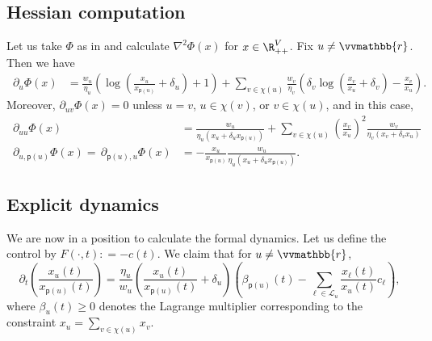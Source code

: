 \documentclass{toc}
\newcommand{\calL}{\mathcal L}
\newcommand{\vvr}{\vvmathbb{r}}
\newcommand{\seteq}{\mathrel{\mathop:}=}
\newcommand{\sfp}{\mathsf{p}}
\begin{document}
\subsection{Hessian computation}

Let us take $\Phi$ as in 
and calculate $\nabla^2 \Phi(x)$ for $x \in \R_{++}^{V}$.
Fix $u \neq \vvr$. 
Then we have
\begin{align}
\, \partial_u\Phi(x) &= 
\frac{w_u}{\eta_u}
\left(\log\left(\frac{x_u}{x_{\sfp(u)}}+\delta_u\right) +1\right)
+ \sum_{v \in \chi(u)}\frac{w_v}{\eta_v}\left(\delta_v\log\left(\frac{x_v}{x_u}+\delta_v\right) - \frac{x_v}{x_u}\right). \label{eq:grad-phi}
\end{align}
Moreover, $\partial_{uv} \Phi(x) = 0$ unless $u=v$, $u \in \chi(v)$, or $v \in \chi(u)$, and in this case,
\begin{align*}
\, \partial_{uu}\Phi(x) &= \frac{w_u}{\eta_u(x_u+\delta_u x_{\sfp(u)})} + \sum_{v\in \chi(u)} \left(\frac{x_v}{x_u}\right)^2\frac{w_v}{\eta_v(x_v+\delta_v x_u)} \\
\, \partial_{u,\sfp(u)}\Phi(x) = \, \partial_{\sfp(u),u}\Phi(x) &= -\frac{x_u}{x_{\sfp(u)}}\frac{w_u}{\eta_u(x_u+\delta_u x_{\sfp(u)})}.
\end{align*}

\subsection{Explicit dynamics}

We are now in a position to calculate the formal dynamics.
Let us define the control by $F(\cdot,t) \seteq -c(t)$.
We claim that for $u \neq \vvr$,
\begin{equation}\label{eq:dyn2}
\partial_t \left(\frac{x_u(t)}{x_{\sfp(u)}(t)}\right) =  \frac{\eta_u}{w_u} \left(\frac{x_u(t)}{x_{\sfp(u)}(t)}+\delta_u\right)
\left(\beta_{\sfp(u)}(t)- \sum_{\ell \in \calL_u} \frac{x_{\ell}(t)}{x_{u}(t)} c_{\ell}\right),
\end{equation}
where $\beta_u(t)\ge 0$ denotes the Lagrange multiplier corresponding to the constraint $x_u = \sum_{v\in \chi(u)} x_v$.
\end{document}
